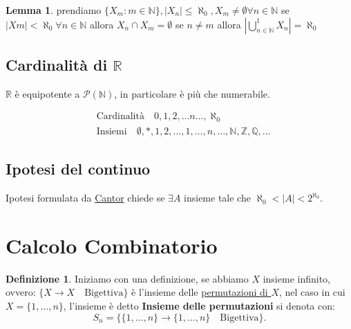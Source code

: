 \documentclass{article}
\theoremstyle{definition}
\newtheorem{definition}{Definizione}[section]
\newtheorem{lemma}{Lemma}[section]
\begin{document}
\begin{tcolorbox}
\begin{lemma}
        prendiamo $\{X_m : m \in \mathbb{N}\}, |X_n| \le \aleph_0, X_m \not = \emptyset \forall n \in \mathbb{N}$ se $|Xm| < \aleph_0 \forall n \in \mathbb{N}$ allora $X_n \cap X_m = \emptyset$ se $n \not = m$ allora $|\bigcup_{n \in \mathbb{N}}^{1}X_n| = \aleph_0$ \newline
\end{lemma}
\end{tcolorbox}



\subsection{Cardinalità di $\mathbb{R}$}\label{sec:cardinalita_di_R}
$ \mathbb{R}$ è equipotente a $\mathcal{P}(\mathbb{N})$, in particolare è più che numerabile. \par

\begin{align*}
        & \mbox{Cardinalità} \quad 0,1,2,\ldots n\ldots,\aleph_0 \\
        & \mbox{Insiemi} \quad \emptyset, {*}, {1,2}, \ldots, {1,\ldots,n},\ldots,\mathbb{N},\mathbb{Z},\mathbb{Q},\ldots        
\end{align*}



\subsection{Ipotesi del continuo}\label{sec:ipotesi_del_continuo}
Ipotesi formulata da \underline{Cantor} chiede se $ \exists A$ insieme tale che $\boxed{\aleph_0 < |A| < 2^{\aleph_0}}$.






\newpage
\section{Calcolo Combinatorio}\label{sec:calcolo_combinatorio}
\begin{definition}
Iniziamo con una definizione, se abbiamo $X$ insieme infinito, \newline ovvero: $\{X \to X \quad \mbox{Bigettiva}\}$ è l'insieme delle \underline{permutazioni di $X$}, nel caso in cui $X = \{1,\ldots, n\}$, l'insieme è detto \textbf{Insieme delle permutazioni} si denota con:
\begin{equation*}
        \boxed{S_n = \{\{1,\ldots, n\} \to \{ 1,\ldots,n\} \quad \mbox{Bigettiva}\}}.
\end{equation*}
\end{definition}
\end{document}

